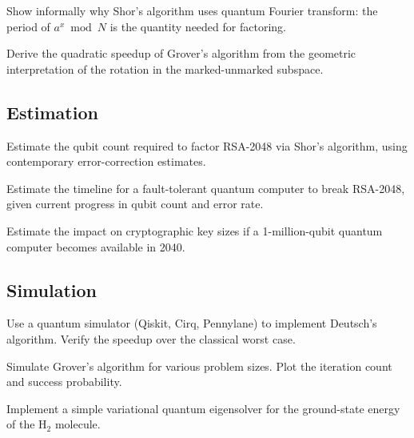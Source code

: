\begin{exercise}
Show informally why Shor's algorithm uses quantum Fourier transform: the period of $a^x \bmod N$ is the quantity needed for factoring.
\end{exercise}

\begin{exercise}
Derive the quadratic speedup of Grover's algorithm from the geometric interpretation of the rotation in the marked-unmarked subspace.
\end{exercise}

\subsection*{Estimation}

\begin{exercise}
Estimate the qubit count required to factor RSA-2048 via Shor's algorithm, using contemporary error-correction estimates.
\end{exercise}

\begin{exercise}
Estimate the timeline for a fault-tolerant quantum computer to break RSA-2048, given current progress in qubit count and error rate.
\end{exercise}

\begin{exercise}
Estimate the impact on cryptographic key sizes if a 1-million-qubit quantum computer becomes available in 2040.
\end{exercise}

\subsection*{Simulation}

\begin{exercise}
Use a quantum simulator (Qiskit, Cirq, Pennylane) to implement Deutsch's algorithm. Verify the speedup over the classical worst case.
\end{exercise}

\begin{exercise}
Simulate Grover's algorithm for various problem sizes. Plot the iteration count and success probability.
\end{exercise}

\begin{exercise}
Implement a simple variational quantum eigensolver for the ground-state energy of the H$_2$ molecule.
\end{exercise}

